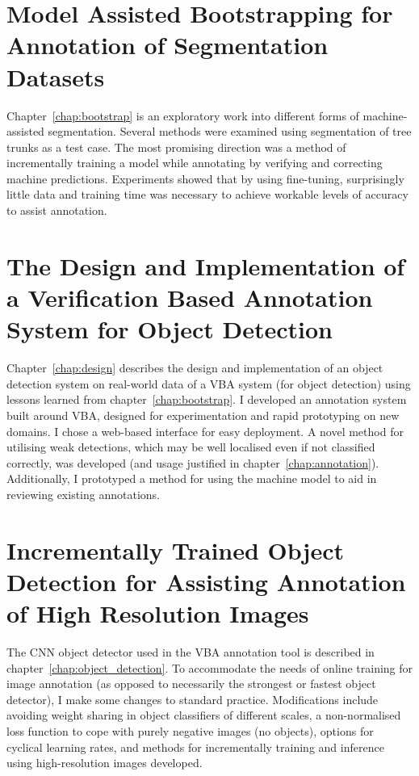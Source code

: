 \section{Model Assisted Bootstrapping for Annotation of Segmentation Datasets}
Chapter~\ref{chap:bootstrap} is an exploratory work into different forms of machine-assisted segmentation. Several methods were examined using segmentation of tree trunks as a test case. The most promising direction was a method of incrementally training a model while annotating by verifying and correcting machine predictions. Experiments showed that by using fine-tuning, surprisingly little data and training time was necessary to achieve workable levels of accuracy to assist annotation. 

\section{The Design and Implementation of a Verification Based Annotation System for Object Detection}
Chapter~\ref{chap:design} describes the design and implementation of an object detection system on real-world data of a \gls{VBA} system (for object detection) using lessons learned from chapter~\ref{chap:bootstrap}. I developed an annotation system built around \gls{VBA},  designed for experimentation and rapid prototyping on new domains.  I chose a web-based interface for easy deployment. A novel method for utilising weak detections, which may be well localised even if not classified correctly, was developed (and usage justified in chapter~\ref{chap:annotation}). Additionally, I prototyped a method for using the machine model to aid in reviewing existing annotations.

\section{Incrementally Trained Object Detection for Assisting Annotation of High Resolution Images}
The \gls{CNN} object detector used in the \gls{VBA} annotation tool is described in chapter~\ref{chap:object_detection}. To accommodate the needs of online training for image annotation (as opposed to necessarily the strongest or fastest object detector), I make some changes to standard practice. Modifications include avoiding weight sharing in object classifiers of different scales, a non-normalised loss function to cope with purely negative images (no objects),  options for cyclical learning rates, and methods for incrementally training and inference using high-resolution images developed. 

